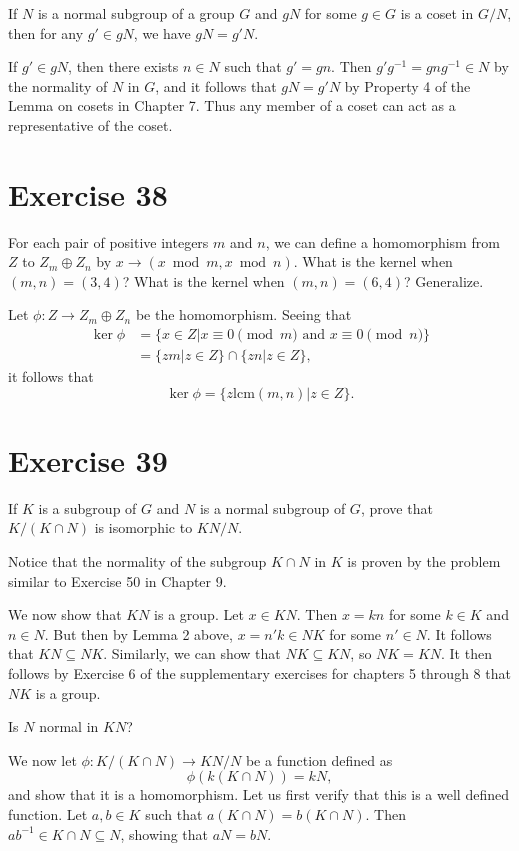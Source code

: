 \documentclass[12pt]{article}
\newcommand{\lcm}{\mbox{lcm}}
\begin{document}
If $N$ is a normal subgroup of a group $G$ and
$gN$ for some $g\in G$ is a coset in $G/N$, then
for any $g'\in gN$, we have $gN=g'N$.

If $g'\in gN$, then there exists $n\in N$ such that $g'=gn$.
Then $g'g^{-1}=gng^{-1}\in N$ by the normality of $N$ in $G$,
and it follows that $gN=g'N$ by Property 4 of the Lemma on cosets
in Chapter 7.  Thus any member of a coset can act as a representative
of the coset.

\section*{Exercise 38}

For each pair of positive integers $m$ and $n$, we can define a homomorphism
from $Z$ to $Z_m\oplus Z_n$ by $x\to (x\bmod m, x\bmod n)$.  What is the
kernel when $(m,n)=(3,4)$?  What is the kernel when $(m,n)=(6,4)$?
Generalize.

Let $\phi:Z\to Z_m\oplus Z_n$ be the homomorphism.  Seeing that
\begin{align*}
\ker\phi&=\{x\in Z|\mbox{$x\equiv 0\pmod m$ and $x\equiv 0\pmod n$}\} \\
 &=\{zm|z\in Z\}\cap\{zn|z\in Z\},
\end{align*}
it follows that
\begin{equation*}
\ker\phi=\{z\lcm(m,n)|z\in Z\}.
\end{equation*}

\section*{Exercise 39}

If $K$ is a subgroup of $G$ and $N$ is a normal subgroup of $G$,
prove that $K/(K\cap N)$ is isomorphic to $KN/N$.

Notice that the normality of the subgroup $K\cap N$ in $K$ is proven
by the problem similar to Exercise 50 in Chapter 9.

We now show that $KN$ is a group.
Let $x\in KN$.  Then $x=kn$ for some $k\in K$ and $n\in N$.
But then by Lemma 2 above, $x=n'k\in NK$ for some $n'\in N$.
It follows that $KN\subseteq NK$.
Similarly, we can show that $NK\subseteq KN$, so $NK=KN$.
It then follows by Exercise 6 of the supplementary exercises
for chapters 5 through 8 that $NK$ is a group.

Is $N$ normal in $KN$?

We now let $\phi:K/(K\cap N)\to KN/N$ be a function defined as
\begin{equation*}
\phi(k(K\cap N))=kN,
\end{equation*}
and show that it is a homomorphism.  Let us first verify that this
is a well defined function.  Let $a,b\in K$ such that $a(K\cap N)=b(K\cap N)$.
Then $ab^{-1}\in K\cap N\subseteq N$, showing that $aN=bN$.
\end{document}
